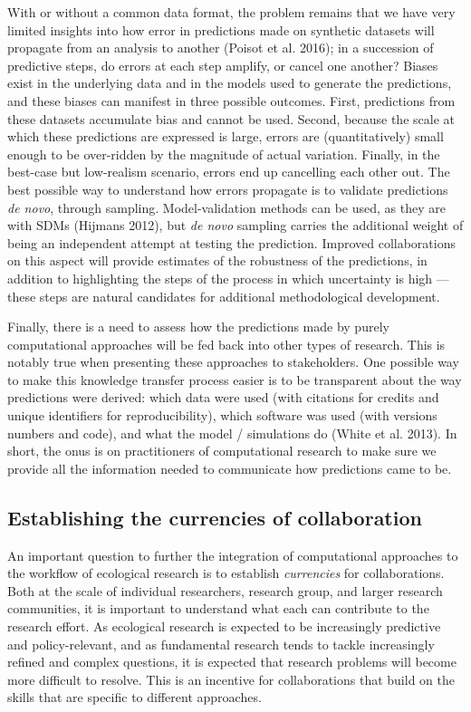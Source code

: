 \documentclass[12pt]{article}
\begin{document}
With or without a common data format, the problem remains that we have
very limited insights into how error in predictions made on synthetic
datasets will propagate from an analysis to another (Poisot et al.
2016); in a succession of predictive steps, do errors at each step
amplify, or cancel one another? Biases exist in the underlying data and
in the models used to generate the predictions, and these biases can
manifest in three possible outcomes. First, predictions from these
datasets accumulate bias and cannot be used. Second, because the scale
at which these predictions are expressed is large, errors are
(quantitatively) small enough to be over-ridden by the magnitude of
actual variation. Finally, in the best-case but low-realism scenario,
errors end up cancelling each other out. The best possible way to
understand how errors propagate is to validate predictions \emph{de
novo}, through sampling. Model-validation methods can be used, as they
are with SDMs (Hijmans 2012), but \emph{de novo} sampling carries the
additional weight of being an independent attempt at testing the
prediction. Improved collaborations on this aspect will provide
estimates of the robustness of the predictions, in addition to
highlighting the steps of the process in which uncertainty is high ---
these steps are natural candidates for additional methodological
development.

Finally, there is a need to assess how the predictions made by purely
computational approaches will be fed back into other types of research.
This is notably true when presenting these approaches to stakeholders.
One possible way to make this knowledge transfer process easier is to be
transparent about the way predictions were derived: which data were used
(with citations for credits and unique identifiers for reproducibility),
which software was used (with versions numbers and code), and what the
model / simulations do (White et al. 2013). In short, the onus is on
practitioners of computational research to make sure we provide all the
information needed to communicate how predictions came to be.

\hypertarget{establishing-the-currencies-of-collaboration}{%
\subsection{Establishing the currencies of
collaboration}\label{establishing-the-currencies-of-collaboration}}

An important question to further the integration of computational
approaches to the workflow of ecological research is to establish
\emph{currencies} for collaborations. Both at the scale of individual
researchers, research group, and larger research communities, it is
important to understand what each can contribute to the research effort.
As ecological research is expected to be increasingly predictive and
policy-relevant, and as fundamental research tends to tackle
increasingly refined and complex questions, it is expected that research
problems will become more difficult to resolve. This is an incentive for
collaborations that build on the skills that are specific to different
approaches.
\end{document}
